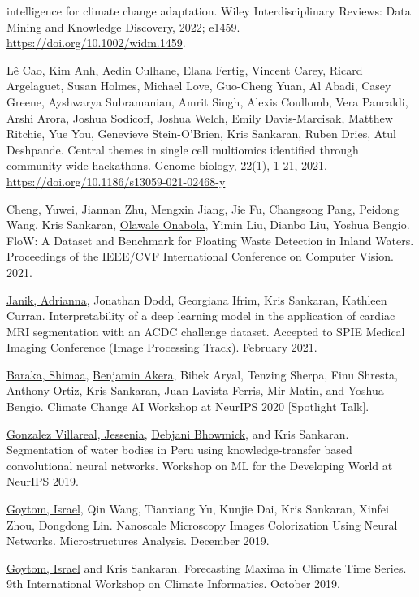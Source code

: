 \documentclass[letterpaper]{article}
\renewenvironment{itemize}{
  \begin{list}{}{
    \setlength{\leftmargin}{1.5em}
  }
}{
  \end{list}
}
\begin{document}
\begin{itemize}
intelligence for climate change adaptation. Wiley Interdisciplinary Reviews:
Data Mining and Knowledge Discovery, 2022; e1459. \href{https://doi.org/10.1002/widm.1459
}{https://doi.org/10.1002/widm.1459}.
\item Lê Cao, Kim Anh, Aedin Culhane, Elana Fertig, Vincent Carey, Ricard
  Argelaguet, Susan Holmes, Michael Love, Guo-Cheng Yuan, Al Abadi, Casey
  Greene, Ayshwarya Subramanian, Amrit Singh, Alexis Coullomb, Vera Pancaldi,
  Arshi Arora, Joshua Sodicoff, Joshua Welch, Emily Davis-Marcisak, Matthew
  Ritchie, Yue You, Genevieve Stein-O’Brien, Kris Sankaran, Ruben Dries, Atul
  Deshpande. Central themes in single cell multiomics identified through
  community-wide hackathons. Genome biology, 22(1), 1-21, 2021.
  \href{https://doi.org/10.1186/s13059-021-02468-y}{https://doi.org/10.1186/s13059-021-02468-y}
\item Cheng, Yuwei, Jiannan Zhu, Mengxin Jiang, Jie Fu, Changsong Pang,
Peidong Wang, Kris Sankaran, \underline{Olawale Onabola}, Yimin Liu, Dianbo Liu, Yoshua
Bengio. FloW: A Dataset and Benchmark for Floating Waste Detection in Inland
Waters. Proceedings of the IEEE/CVF International Conference on Computer
Vision. 2021.
\item \underline{Janik, Adrianna}, Jonathan Dodd, Georgiana Ifrim, Kris Sankaran, Kathleen
  Curran. Interpretability of a deep learning model in the application of
  cardiac MRI segmentation with an ACDC challenge dataset. Accepted to SPIE
  Medical Imaging Conference (Image Processing Track). February 2021.
\item \underline{Baraka, Shimaa}, \underline{Benjamin Akera}, Bibek Aryal,
Tenzing Sherpa, Finu Shresta, Anthony Ortiz, Kris Sankaran, Juan Lavista
Ferris, Mir Matin, and Yoshua Bengio. Climate Change AI Workshop at NeurIPS
2020 [Spotlight Talk].
\item \underline{Gonzalez Villareal, Jessenia}, \underline{Debjani Bhowmick},
and Kris Sankaran. Segmentation of water bodies in Peru using
knowledge-transfer based convolutional neural networks. Workshop on ML for the
Developing World at NeurIPS 2019.
\item \underline{Goytom, Israel}, Qin Wang, Tianxiang Yu, Kunjie Dai, Kris
Sankaran, Xinfei Zhou, Dongdong Lin. Nanoscale Microscopy Images Colorization
Using Neural Networks. Microstructures Analysis. December 2019.
\item \underline{Goytom, Israel} and Kris Sankaran. Forecasting Maxima in
Climate Time Series. 9th International Workshop on Climate Informatics.
October 2019.

\end{itemize}
\end{document}
